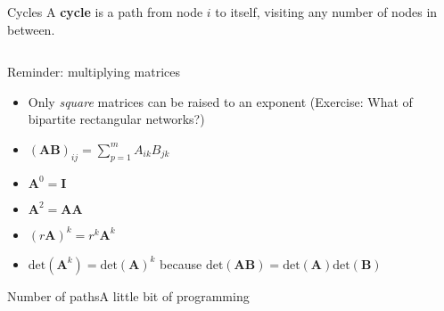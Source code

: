 \documentclass[mathserif,usenames,professionalfonts,11pt,aspectratio=149]{beamer}
\begin{document}
\begin{frame}{Cycles}
   A \textbf{cycle} is a path from node $i$ to itself, visiting any number of nodes in between.
   \vfill
   \begin{columns}[c]
      \begin{column}{0.5\textwidth}
         
      \end{column}
       \begin{column}{0.5\textwidth}
          
       \end{column}
   \end{columns}
\end{frame}

\begin{frame}{Reminder: multiplying matrices}
   \begin{itemize}
      \item Only \emph{square} matrices can be raised to an exponent (\alert{Exercise}: What of bipartite rectangular networks?)
      \item $(\mathbf{AB})_{ij} = \sum_{p=1}^m A_{ik} B_{jk}$
      \item $\mathbf{A}^0 = \mathbf{I}$
      \item $\mathbf{A}^2 = \mathbf{A}\mathbf{A}$
      \item $(r\mathbf{A})^k = r^k\mathbf{A}^k$
      \item $\mathrm{det}(\mathbf{A}^k) = \mathrm{det}(\mathbf{A})^k$ because $\mathrm{det}(\mathbf{A}\mathbf{B}) = \mathrm{det}(\mathbf{A})\mathrm{det}(\mathbf{B})$
   \end{itemize}
\end{frame}


\begin{frame}{Number of paths}{A little bit of programming}
   \begin{columns}[c]
      \begin{column}{0.5\textwidth}
         
      \end{column}
   \end{columns}
\end{frame}
\end{document}
